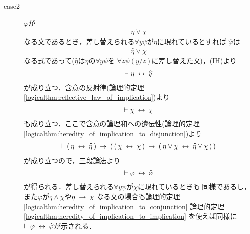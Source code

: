 \begin{sketch}
\begin{description}
\begin{description}
				\item[case2] 
					$\varphi$が
					\begin{align}
						\eta \vee \chi
					\end{align}
					なる文であるとき，差し替えられる$\forall y \psi$が$\eta$に現れているとすれば
					$\widehat{\varphi}$は
					\begin{align}
						\widehat{\eta} \vee \chi
					\end{align}
					なる式であって($\widehat{\eta}$は$\eta$の$\forall y \psi$を
					$\forall z \psi(y/z)$に差し替えた文)，(IH)より
					\begin{align}
						\vdash \eta \hspace{0.25em}\leftrightarrow\hspace{0.25em} \widehat{\eta}
					\end{align}
					が成り立つ．含意の反射律(論理的定理
					\ref{logicalthm:reflective_law_of_implication})より
					\begin{align}
						\vdash \chi \hspace{0.25em}\leftrightarrow\hspace{0.25em} \chi
					\end{align}
					も成り立つ．ここで含意の論理和への遺伝性(論理的定理
					\ref{logicalthm:heredity_of_implication_to_disjunction})より
					\begin{align}
						\vdash (\, \eta \hspace{0.25em}\leftrightarrow\hspace{0.25em} \widehat{\eta}\, ) 
						\hspace{0.25em}\rightarrow\hspace{0.25em} (\, (\, \chi \hspace{0.25em}\leftrightarrow\hspace{0.25em} \chi\, )
						\hspace{0.25em}\rightarrow\hspace{0.25em} (\, \eta \vee \chi \hspace{0.25em}\leftrightarrow\hspace{0.25em} 
						\widehat{\eta} \vee \chi\, )\, )
					\end{align}
					が成り立つので，三段論法より
					\begin{align}
						\vdash \varphi \hspace{0.25em}\leftrightarrow\hspace{0.25em} \widehat{\varphi}
					\end{align}
					が得られる．差し替えられる$\forall y \psi$が$\chi$に現れているときも
					同様であるし，また$\varphi$が$\eta \wedge \chi$や$\eta \hspace{0.25em}\rightarrow\hspace{0.25em} \chi$
					なる文の場合も論理的定理
					\ref{logicalthm:heredity_of_implication_to_conjunction}
					論理的定理
					\ref{logicalthm:heredity_of_implication_to_implication}
					を使えば同様に$\vdash \varphi \hspace{0.25em}\leftrightarrow\hspace{0.25em} \widehat{\varphi}$が示される．
					

\end{description}
\end{description}
\end{sketch}
